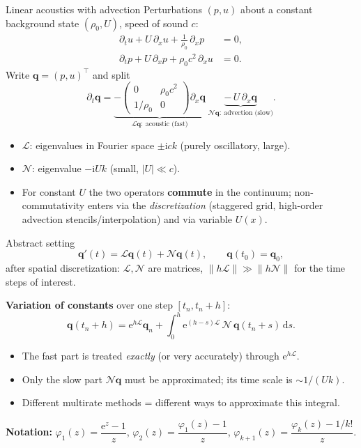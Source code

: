 \documentclass[aspectratio=169,10pt]{beamer}
\newcommand{\dd}{\mathrm{d}}
\newcommand{\ii}{\mathrm{i}}
\newcommand{\ee}{\mathrm{e}}
\newcommand{\bq}{\mathbf{q}}
\newcommand{\LL}{\mathcal{L}}   %
\newcommand{\NN}{\mathcal{N}}   %
\newcommand{\ph}{\varphi}
\begin{document}
	\begin{frame}{Linear acoustics with advection}
		Perturbations $(p,u)$ about a constant background state $(\rho_0,U)$, speed of sound $c$:
		\begin{align*}
			\partial_t u + U\,\partial_x u + \tfrac{1}{\rho_0}\,\partial_x p &= 0,\\
			\partial_t p + U\,\partial_x p + \rho_0 c^2\,\partial_x u &= 0.
		\end{align*}
		Write $\bq=(p,u)^\top$ and split
		\[
		\partial_t \bq = \underbrace{-\begin{pmatrix}0&\rho_0c^2\\ 1/\rho_0&0\end{pmatrix}\partial_x\bq}_{\LL\bq:\ \text{acoustic (fast)}}
		\;\underbrace{-\,U\,\partial_x\bq}_{\NN\bq:\ \text{advection (slow)}}.
		\]
		\begin{itemize}
			\item $\LL$: eigenvalues in Fourier space $\pm\ii c k$ (purely oscillatory, large).
			\item $\NN$: eigenvalue $-\ii U k$ (small, $|U|\ll c$).
			\item For constant $U$ the two operators \textbf{commute} in the continuum; non-commutativity enters via
			the \emph{discretization} (staggered grid, high-order advection stencils/interpolation) and via variable $U(x)$.
		\end{itemize}
	\end{frame}
	
	\begin{frame}{Abstract setting}
		\[
		\bq'(t)=\LL\bq(t)+\NN\bq(t),\qquad \bq(t_0)=\bq_0 ,
		\]
		after spatial discretization: $\LL,\NN$ are matrices, $\|h\LL\|\gg\|h\NN\|$ for the time steps of interest.
		
		\medskip
		\textbf{Variation of constants} over one step $[t_n,t_n+h]$:
		\[
		\bq(t_n+h)=\ee^{h\LL}\bq_n+\int_0^h \ee^{(h-s)\LL}\,\NN\,\bq(t_n+s)\,\dd s .
		\]
		\begin{itemize}
			\item The fast part is treated \emph{exactly} (or very accurately) through $\ee^{h\LL}$.
			\item Only the slow part $\NN\bq$ must be approximated; its time scale is $\sim 1/(Uk)$.
			\item Different multirate methods = different ways to approximate this integral.
		\end{itemize}
		\vspace{0.3em}
		\textbf{Notation:} $\ph_1(z)=\dfrac{\ee^z-1}{z}$, \quad $\ph_2(z)=\dfrac{\ph_1(z)-1}{z}$, \quad $\ph_{k+1}(z)=\dfrac{\ph_k(z)-1/k!}{z}$.
	\end{frame}
	
\end{document}
